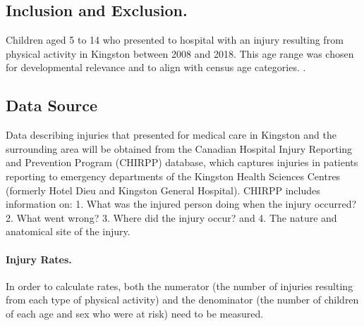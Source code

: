 \documentclass [11pt]{article}
\begin{document}
\subsection{Inclusion and Exclusion.} Children aged 5 to 14 who presented to hospital with an injury resulting from physical activity in Kingston between 2008 and 2018. This age range was chosen for developmental relevance and to align with census age categories. \cite{truelove2017defining, Government_of_Canada2017-iu}. 

\subsection{Data Source} 

Data describing injuries that presented for medical care in Kingston and the surrounding area will be obtained from the Canadian Hospital Injury Reporting and Prevention Program (CHIRPP) database, which captures injuries in patients reporting to emergency departments of the Kingston Health Sciences Centres (formerly Hotel Dieu and Kingston General Hospital). CHIRPP includes information on: 1. What was the injured person doing when the injury occurred? 2. What went wrong? 3. Where did the injury occur? and 4. The nature and anatomical site of the injury. 

\paragraph{Injury Rates.} In order to calculate rates, both the numerator (the number of injuries resulting from each type of physical activity) and the denominator (the number of children of each age and sex who were at risk) need to be measured. 
\end{document}
